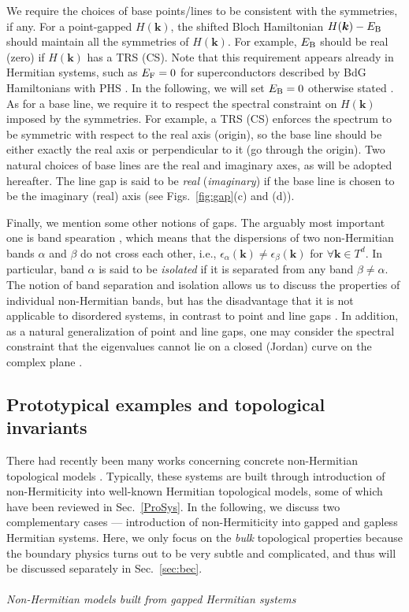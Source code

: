 \documentclass{tADP2e}
\theoremstyle{plain}
\theoremstyle{plain}
\theoremstyle{definition}
\begin{document}
We require the choices of base points/lines to be consistent with the symmetries, if any. 
For a point-gapped $H(\boldsymbol{k})$, the shifted Bloch Hamiltonian $H(\boldsymbol{k})-E_{\rm B}$ should maintain all the symmetries of $H(\boldsymbol{k})$. For example, $E_{\rm B}$ should be real (zero) if $H(\boldsymbol{k})$ has a TRS (CS). Note that this requirement appears already in Hermitian systems, such as $E_{\rm F}=0$ for superconductors described by BdG Hamiltonians with PHS \cite{FS09}. In the following, we will  set $E_{\rm B}=0$ otherwise stated  \cite{ZG18}. As for a base line, we require it to respect the spectral constraint on $H(\boldsymbol{k})$ imposed by the symmetries. For example, a TRS (CS) enforces the spectrum to be symmetric with respect to the real axis (origin), so the base line should be either exactly the real axis or perpendicular to it (go through the origin). Two natural choices of base lines are the real and imaginary axes, as will be adopted hereafter. %
The line gap is said to be \emph{real} (\emph{imaginary}) if the base line is chosen to be the imaginary (real) axis (see Figs.~\ref{fig:gap}(c) and (d)).






Finally, we mention some other notions of gaps. The arguably most important one is {band spearation} \cite{SH18}, which means that the dispersions of two non-Hermitian bands $\alpha$ and $\beta$ do not cross each other, i.e., $\epsilon_\alpha(\boldsymbol{k})\neq \epsilon_\beta(\boldsymbol{k})$ for $\forall\boldsymbol{k}\in T^d$. In particular, band $\alpha$ is said to be \emph{isolated} if it is separated from any band $\beta\neq\alpha$. The notion of band separation and isolation allows us to discuss the properties of individual non-Hermitian bands, but has the disadvantage that it is not applicable to disordered systems, in contrast to point and line gaps \cite{ZL19}. In addition, as a natural generalization of point and line gaps, one may consider the spectral constraint that the eigenvalues cannot lie on a closed (Jordan) curve on the complex plane \cite{BDS20} . 

\subsection{Prototypical examples and topological invariants}\label{Sec:5peti}
There had recently been many  
works concerning concrete non-Hermitian topological models \cite{RMS09,HYC11,HS13,LR14,MS15,CY15,PSJ16,XY17,LD17,LTE16,NX18,YC18,LS18,ZL18,LC18,YC18}. Typically, these systems are built through introduction of non-Hermiticity into well-known Hermitian topological models, some of which have been reviewed in Sec.~\ref{ProSys}. In the following, we discuss two complementary cases --- introduction of non-Hermiticity  into gapped and gapless Hermitian systems.  
Here, we only focus on the \emph{bulk} topological properties  
because the boundary physics turns out to be very subtle and complicated, and thus will be discussed separately in Sec.~\ref{sec:bec}. 
\\ \\ {\it Non-Hermitian models built from gapped Hermitian systems}
\end{document}
